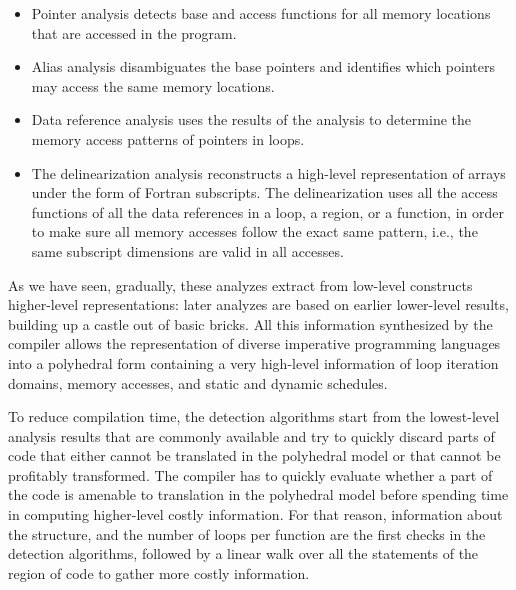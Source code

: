 \documentclass{sig-alternate}
\begin{document}
\begin{itemize}
\item Pointer analysis detects base and access functions for all memory
  locations that are accessed in the program.

\item Alias analysis disambiguates the base pointers and identifies which
  pointers may access the same memory locations.

\item Data reference analysis uses the results of the \scev{} analysis to determine
  the memory access patterns of pointers in loops.

\item The delinearization analysis \cite{delinearization1, delinearization2}
  reconstructs a high-level representation of arrays under the form of Fortran
  subscripts.  The delinearization uses all the access functions of all the data
  references in a loop, a region, or a function, in order to make sure all
  memory accesses follow the exact same pattern, i.e., the same subscript
  dimensions are valid in all accesses.
\end{itemize}

As we have seen, gradually, these analyzes extract from low-level constructs
higher-level representations: later analyzes are based on earlier lower-level
results, building up a castle out of basic bricks.  All this information
synthesized by the compiler allows the representation of diverse imperative
programming languages into a polyhedral form \cite{Girbal} containing a very
high-level information of loop iteration domains, memory accesses, and static
and dynamic schedules.

To reduce compilation time, the \SCoP{} detection algorithms start from the
lowest-level analysis results that are commonly available and try to quickly
discard parts of code that either cannot be translated in the polyhedral model
or that cannot be profitably transformed.  The compiler has to quickly evaluate
whether a part of the code is amenable to translation in the polyhedral model
before spending time in computing higher-level costly information.  For that
reason, information about the \CFG{} structure, and the number of loops per
function are the first checks in the \SCoP{} detection algorithms, followed by a
linear walk over all the statements of the region of code to gather more costly
information.
\end{document}
